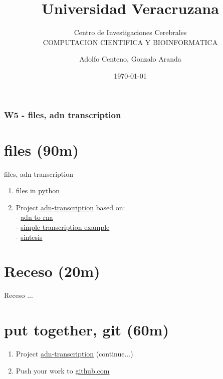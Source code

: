 \documentclass{beamer}
\begin{document}
\title{Universidad Veracruzana}  
\subtitle{Centro de Investigaciones Cerebrales\\COMPUTACION CIENTIFICA Y BIOINFORMATICA}
\author{Adolfo Centeno, Gonzalo Aranda}
\date{\today} 

\begin{frame}
\titlepage
\end{frame}

\begin{frame}\frametitle{W5 - files, adn transcription }
\tableofcontents
\end{frame} 


\section{files (90m) }

\begin{frame}

files, adn transcription

\begin{enumerate}

\item

	\href{https://github.com/adsoftsito/python/blob/master/w5/files.py}{files} in python

\item
	Project \href{https://github.com/adsoftsito/python/blob/master/w5/adntranscription.py}{adn-transcription} based on:\\
	  - \href{https://www.youtube.com/watch?v=fA2Vp3qgfDM}{adn to rna} \\
      - \href{https://www.youtube.com/watch?v=iXNhQoLNtYo&t=382s}{simple transcription example} \\
      - \href{https://www.youtube.com/watch?v=VEy8TYGs4mA&t=478s}{sintesis}
	
	
\end{enumerate} 


\end{frame}


\section{Receso  (20m) }

\begin{frame}


Receso ...

\end{frame}


\section{put together,  git (60m) }

\begin{frame}

\begin{enumerate}

\item
	Project \href{https://github.com/adsoftsito/python/blob/master/w5/adntranscription.py}{adn-transcription} (continue...)

\item
	Push your work to \href{https://github.com}{github.com}

\end{enumerate} 


\end{frame}
\end{document}
